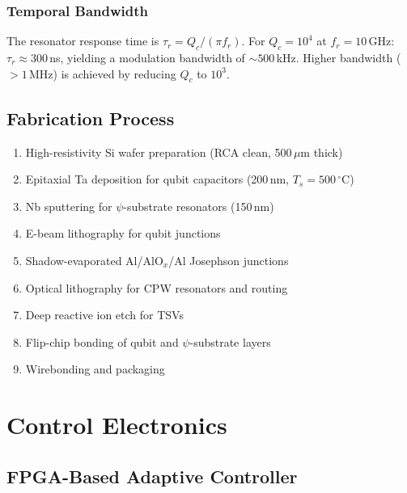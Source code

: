 \documentclass[11pt,letterpaper]{article}
\begin{document}
\subsubsection{Temporal Bandwidth}

The resonator response time is $\tau_r = Q_c/(\pi f_r)$. For
$Q_c = 10^4$ at $f_r = 10$\,GHz: $\tau_r \approx 300$\,ns, yielding
a modulation bandwidth of $\sim 500$\,kHz. Higher bandwidth ($>1$\,MHz)
is achieved by reducing $Q_c$ to $10^3$.

\subsection{Fabrication Process}

\begin{enumerate}
\item High-resistivity Si wafer preparation (RCA clean, 500\,$\mu$m thick)
\item Epitaxial Ta deposition for qubit capacitors (200\,nm, $T_s = 500\,^\circ$C)
\item Nb sputtering for $\psi$-substrate resonators (150\,nm)
\item E-beam lithography for qubit junctions
\item Shadow-evaporated Al/AlO$_x$/Al Josephson junctions
\item Optical lithography for CPW resonators and routing
\item Deep reactive ion etch for TSVs
\item Flip-chip bonding of qubit and $\psi$-substrate layers
\item Wirebonding and packaging
\end{enumerate}

\section{Control Electronics}

\subsection{FPGA-Based Adaptive Controller}
\end{document}
